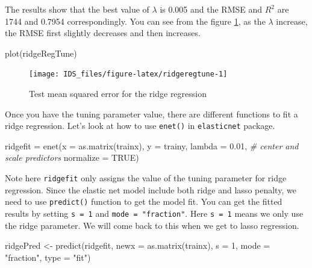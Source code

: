 \documentclass[
  12pt,
]{krantz}
\makeatletter
\newenvironment{Shaded}{\begin{snugshade}}{\end{snugshade}}
\newcommand{\AttributeTok}[1]{\textcolor[rgb]{0.61,0.61,0.61}{#1}}
\newcommand{\CommentTok}[1]{\textcolor[rgb]{0.37,0.37,0.37}{\textit{#1}}}
\newcommand{\ConstantTok}[1]{\textcolor[rgb]{0,0,0}{#1}}
\newcommand{\DecValTok}[1]{\textcolor[rgb]{0.06,0.06,0.06}{#1}}
\newcommand{\FloatTok}[1]{\textcolor[rgb]{0.06,0.06,0.06}{#1}}
\newcommand{\FunctionTok}[1]{\textcolor[rgb]{0,0,0}{#1}}
\newcommand{\NormalTok}[1]{#1}
\newcommand{\OtherTok}[1]{\textcolor[rgb]{0.37,0.37,0.37}{#1}}
\newcommand{\StringTok}[1]{\textcolor[rgb]{0.5,0.5,0.5}{#1}}
\newenvironment{kframe}{%
\medskip{}
\setlength{\fboxsep}{.8em}
 \def\at@end@of@kframe{}%
 \ifinner\ifhmode%
  \def\at@end@of@kframe{\end{minipage}}%
  \begin{minipage}{\columnwidth}%
 \fi\fi%
 \def\FrameCommand##1{\hskip\@totalleftmargin \hskip-\fboxsep
 \colorbox{shadecolor}{##1}\hskip-\fboxsep
     \hskip-\linewidth \hskip-\@totalleftmargin \hskip\columnwidth}%
 \MakeFramed {\advance\hsize-\width
   \@totalleftmargin\z@ \linewidth\hsize
   \@setminipage}}%
 {\par\unskip\endMakeFramed%
 \at@end@of@kframe}
\renewenvironment{Shaded}{\begin{kframe}}{\end{kframe}}
\makeatother
\begin{document}
The results show that the best value of \(\lambda\) is 0.005 and the RMSE and \(R^{2}\) are 1744 and 0.7954 correspondingly. You can see from the figure \ref{fig:ridgeregtune}, as the \(\lambda\) increase, the RMSE first slightly decreases and then increases.

\begin{Shaded}
\begin{Highlighting}[]
\FunctionTok{plot}\NormalTok{(ridgeRegTune)}
\end{Highlighting}
\end{Shaded}

\begin{figure}

{\centering \texttt{[image: IDS\_files/figure-latex/ridgeregtune-1]} 

}

\caption{Test mean squared error for the ridge regression}\label{fig:ridgeregtune}
\end{figure}

Once you have the tuning parameter value, there are different functions to fit a ridge regression. Let's look at how to use \texttt{enet()} in \texttt{elasticnet} package.

\begin{Shaded}
\begin{Highlighting}[]
\NormalTok{ridgefit }\OtherTok{=} \FunctionTok{enet}\NormalTok{(}\AttributeTok{x =} \FunctionTok{as.matrix}\NormalTok{(trainx), }\AttributeTok{y =}\NormalTok{ trainy, }\AttributeTok{lambda =} \FloatTok{0.01}\NormalTok{,}
                \CommentTok{\# center and scale predictors}
                \AttributeTok{normalize =} \ConstantTok{TRUE}\NormalTok{)}
\end{Highlighting}
\end{Shaded}

Note here \texttt{ridgefit} only assigns the value of the tuning parameter for ridge regression. Since the elastic net model include both ridge and lasso penalty, we need to use \texttt{predict()} function to get the model fit. You can get the fitted results by setting \texttt{s\ =\ 1} and \texttt{mode\ =\ "fraction"}. Here \texttt{s\ =\ 1} means we only use the ridge parameter. We will come back to this when we get to lasso regression.

\begin{Shaded}
\begin{Highlighting}[]
\NormalTok{ridgePred }\OtherTok{\textless{}{-}} \FunctionTok{predict}\NormalTok{(ridgefit, }\AttributeTok{newx =} \FunctionTok{as.matrix}\NormalTok{(trainx), }
                     \AttributeTok{s =} \DecValTok{1}\NormalTok{, }\AttributeTok{mode =} \StringTok{"fraction"}\NormalTok{, }\AttributeTok{type =} \StringTok{"fit"}\NormalTok{)}
\end{Highlighting}
\end{Shaded}
\end{document}
